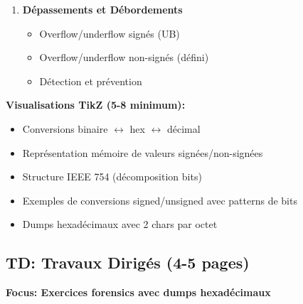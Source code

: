 \documentclass[10pt,a4paper]{article}
\begin{document}
\begin{enumerate}
\item \textbf{Dépassements et Débordements}
   \begin{itemize}
   \item Overflow/underflow signés (UB)
   \item Overflow/underflow non-signés (défini)
   \item Détection et prévention
   \end{itemize}
\end{enumerate}

\textbf{Visualisations TikZ (5-8 minimum):}
\begin{itemize}
\item Conversions binaire $\leftrightarrow$ hex $\leftrightarrow$ décimal
\item Représentation mémoire de valeurs signées/non-signées
\item Structure IEEE 754 (décomposition bits)
\item Exemples de conversions signed/unsigned avec patterns de bits
\item Dumps hexadécimaux avec 2 chars par octet
\end{itemize}

\subsection*{TD: Travaux Dirigés (4-5 pages)}

\textbf{Focus: Exercices forensics avec dumps hexadécimaux}
\end{document}
